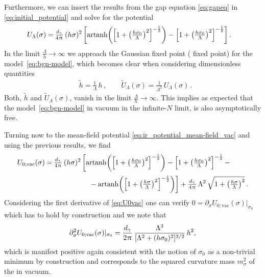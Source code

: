 Furthermore, we can insert the results from the gap equation \eqref{eq:gapeq} in \cref{eq:initial_potential} and solve for the \uv{} potential
	\begin{align}
		U_\Lambda( \sigma ) = \, & \tfrac{d_\gamma}{4 \mkern1.0mu\uppi\mkern1.0mu} \, ( h \sigma )^2 \, \bigg[ \mathrm{artanh} \bigg( \Big[ 1 + \big( \tfrac{h \sigma_0}{\Lambda} \big)^2 \Big]^{- \frac{1}{2}} \bigg) - \Big[ 1 + \big( \tfrac{h \sigma_0}{\Lambda} \big)^2 \Big]^{- \frac{1}{2}} \bigg] \, .		\label{eq:initial-condition}
	\end{align}
In the limit $\tfrac{\Lambda}{h} \to \infty$ we approach the Gaussian fixed point (\uv{} fixed point) for the \bgn{} model~\eqref{eq:bgn-model}, which becomes clear when considering dimensionless quantities
	\begin{align}
		&	\tilde h = \tfrac{1}{\Lambda} \, h \, ,	\qquad	\tilde{U}_\Lambda ( \sigma ) = \tfrac{1}{\Lambda^2} \, U_\Lambda (\sigma ) \, .	\label{eq:gaussian_fixed_point}
	\end{align}
Both, $\tilde{h}$ and $\tilde{U}_\Lambda (\sigma )$, vanish in the limit $\tfrac{\Lambda}{h} \to \infty$. This implies \dash{} as expected \dash{} that the \bgn{} model~\eqref{eq:bgn-model} in vacuum in the infinite-$N$ limit, is also asymptotically free.\bigskip

Turning now to the \ir{} mean-field potential \eqref{eq:ir_potential_mean-field_vac} and using the previous results, we find
\begin{align}
	 U_{0;\mathrm{vac}} ( \sigma )	= \, & \tfrac{d_\gamma}{4 \piu} \, ( h \sigma )^2 \, \bigg[ \mathrm{artanh} \bigg( \Big[ 1 + \big( \tfrac{h \sigma_0}{\Lambda} \big)^2 \Big]^{- \frac{1}{2}} \bigg) - \Big[ 1 + \big( \tfrac{h \sigma_0}{\Lambda} \big)^2 \Big]^{- \frac{1}{2}}\, - \nonumber \\*[.2em] %
	&  \qquad\qquad\quad - \mathrm{artanh} \bigg( \Big[ 1 + \big( \tfrac{h \sigma}{\Lambda} \big)^2 \Big]^{- \frac{1}{2}} \bigg) \bigg] +	 \tfrac{d_\gamma}{4 \piu} \, \Lambda^2 \, \sqrt{1 + \big( \tfrac{h \sigma}{\Lambda} \big)^2 } \, .	\label{eq:U0vac}
\end{align}
Considering the first derivative of \cref{eq:U0vac} one can verify ${0=\partial_\sigma U_{0;\mathrm{vac}}( \sigma )|_{\sigma_0}}$ which has to hold by construction and we note that
	\begin{align}
		\partial_\sigma^2 U_{0; \mathrm{vac}} ( \sigma ) |_{\sigma_0} = \frac{d_\gamma}{2 \mkern1.0mu\uppi\mkern1.0mu} \, \frac{\Lambda^3}{[ \Lambda^2 + ( h \sigma_0 )^2 ]^{3/2}} \, h^2, \label{eq:msigma_MF_Lambda}
	\end{align}
which is manifest positive \dash{} again consistent with the notion of $\sigma_0$ as a non-trivial minimum by construction \dash{} and corresponds to the squared curvature mass $m_\sigma^2$ of the \sigmaMode{} in vacuum.

